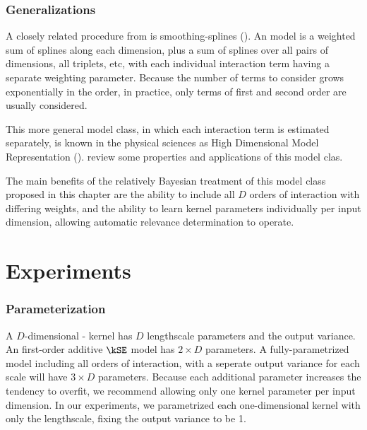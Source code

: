 \subsubsection{Generalizations}

A closely related procedure from \citet{wahba1990spline} is smoothing-splines \ANOVA{} (\SSANOVA{}).
An \SSANOVA{} model is a weighted sum of splines along each dimension, plus a sum of splines over all pairs of dimensions, all triplets, etc, with each individual interaction term having a separate weighting parameter.
Because the number of terms to consider grows exponentially in the order, in practice, only terms of first and second order are usually considered.


This more general model class, in which each interaction term is estimated separately, is known in the physical sciences as High Dimensional Model Representation (\HDMR{}).  \citet{rabitz1999general} review some properties and applications of this model clas.


The main benefits of the relatively Bayesian treatment of this model class proposed in this chapter are the ability to include all $D$ orders of interaction with differing weights, and the ability to learn kernel parameters individually per input dimension, allowing automatic relevance determination to operate.



\section{Experiments}

\subsubsection{Parameterization}
A $D$-dimensional \kSE-\ARD{} kernel has $D$ lengthscale parameters and the output variance.
An first-order additive $\kSE$ model has $2 \times D$ parameters.
A fully-parametrized model including all orders of interaction, with a seperate output variance for each scale will have $3 \times D$ parameters.
Because each additional parameter increases the tendency to overfit, we recommend allowing only one kernel parameter per input dimension. 
%
%
In our experiments, we parametrized each one-dimensional kernel with only the lengthscale, fixing the output variance to be 1.


